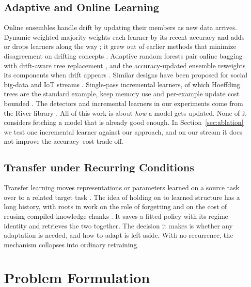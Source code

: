 \documentclass[conference]{IEEEtran}
\begin{document}
\subsection{Adaptive and Online Learning}
Online ensembles handle drift by updating their members as new data arrives. Dynamic
weighted majority weights each learner by its recent accuracy and adds or drops
learners along the way \cite{JMLR:v8:kolter07a}; it grew out of earlier methods that
minimize disagreement on drifting concepts \cite{helmbold1994tracking}. Adaptive random
forests pair online bagging with drift-aware tree replacement
\cite{gomes2017adaptive}, and the accuracy-updated ensemble reweights its components
when drift appears \cite{brzezinski2013reacting}. Similar designs have been proposed
for social big-data and IoT streams \cite{abbasi2021elstream,yang2021pwpae}.
Single-pass incremental learners, of which Hoeffding trees are the standard example,
keep memory use and per-example update cost bounded \cite{domingos2000mining}. The
detectors and incremental learners in our experiments come from the River library
\cite{montiel2021river}. All of this work is about \emph{how} a model gets
updated. None of it considers fetching a model that is already good enough. In
Section~\ref{sec:ablation} we test one incremental learner against our approach, and
on our stream it does not improve the accuracy--cost trade-off.


\subsection{Transfer under Recurring Conditions}
Transfer learning moves representations or parameters learned on a source task over to
a related target task \cite{pan2010transfer}. The idea of holding on to learned structure
has a long history, with roots in work on the role of forgetting
\cite{markovitch1988role} and on the cost of reusing compiled knowledge chunks
\cite{tambe1988some}.
 It saves a fitted policy
with its regime identity and retrieves the two together. The decision it makes is
whether any adaptation is needed, and how to adapt is left aside. With no recurrence,
the mechanism collapses into ordinary retraining.


\section{Problem Formulation}
\end{document}
